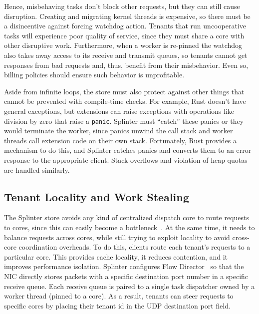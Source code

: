 Hence, misbehaving tasks don't block other requests, but they can still cause
  disruption.
Creating and migrating kernel threads is expensive,
  so there must be a disincentive against forcing watchdog action.
Tenants that run uncooperative tasks will experience poor quality of
  service, since they must share a core with other disruptive
  work.
Furthermore, when a worker is re-pinned the watchdog also takes away access to its
  receive and transmit queues, so tenants cannot get responses from bad
  requests and, thus, benefit from their misbehavior.
Even so, billing policies should ensure such behavior is unprofitable.

Aside from infinite loops, the store must also
  protect against other things that cannot be prevented with compile-time checks.
For example, Rust doesn't have general exceptions, but
  extensions can raise exceptions with operations like division by
  zero that raise a \texttt{panic}.
Splinter must ``catch'' these panics or they would terminate the worker,
  since panics unwind the call stack and worker threads call
  extension code on their own stack.
Fortunately, Rust provides a mechanism to do this, and Splinter catches
    panics and converts them to an error response to the appropriate client.
Stack overflows and violation of heap quotas are handled similarly.

\subsection{Tenant Locality and Work Stealing}
\label{sec:work-stealing}

The Splinter store avoids any kind of centralized dispatch core to route
  requests to cores, since this can easily become a bottleneck~\cite{ramcloud}.
At the same time, it needs to balance requests across cores, while still trying
  to exploit locality to avoid cross-core coordination overheads.
To do this, clients route each tenant's requests to a particular core.
This provides cache locality, it reduces contention, and it improves performance
  isolation.
Splinter configures Flow Director~\cite{flow-director} so that
  the NIC directly stores packets with a specific destination port
  number in a specific
  receive queue.
Each receive queue is paired to a single task dispatcher owned by a
worker thread (pinned to a core).
As a result, tenants can steer requests to specific cores by placing their
  tenant id in the UDP destination port field.

